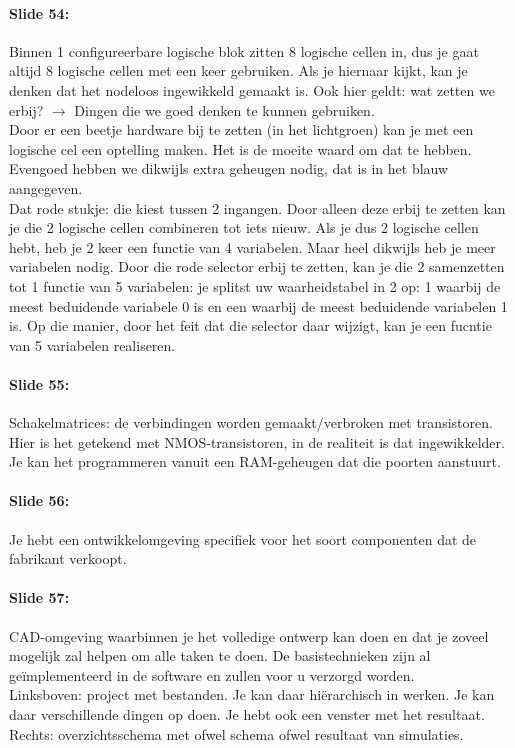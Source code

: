 \documentclass[10pt,a4paper]{book}
\begin{document}
\paragraph{Slide 54:} Binnen 1 configureerbare logische blok zitten 8 logische cellen in, dus je gaat altijd 8 logische cellen met een keer gebruiken. Als je hiernaar kijkt, kan je denken dat het nodeloos ingewikkeld gemaakt is. Ook hier geldt: wat zetten we erbij? $\rightarrow$ Dingen die we goed denken te kunnen gebruiken. \\
Door er een beetje hardware bij te zetten (in het lichtgroen) kan je met een logische cel een optelling maken. Het is de moeite waard om dat te hebben.\\
Evengoed hebben we dikwijls extra geheugen nodig, dat is in het blauw aangegeven.\\
Dat rode stukje: die kiest tussen 2 ingangen. Door alleen deze erbij te zetten kan je die 2 logische cellen combineren tot iets nieuw. Als je dus 2 logische cellen hebt, heb je 2 keer een functie van 4 variabelen. Maar heel dikwijls heb je meer variabelen nodig. Door die rode selector erbij te zetten, kan je die 2 samenzetten tot 1 functie van 5 variabelen: je splitst uw waarheidstabel in 2 op: 1 waarbij de meest beduidende variabele 0 is en een waarbij de meest beduidende variabelen 1 is. Op die manier, door het feit dat die selector daar wijzigt, kan je een fucntie van 5 variabelen realiseren.

\paragraph{Slide 55:} Schakelmatrices: de verbindingen worden gemaakt/verbroken met transistoren.  Hier is het getekend met NMOS-transistoren, in de realiteit is dat ingewikkelder.  Je kan het programmeren vanuit een RAM-geheugen dat die poorten aanstuurt. 

\paragraph{Slide 56:} Je hebt een ontwikkelomgeving specifiek voor het soort componenten dat de fabrikant verkoopt.

\paragraph{Slide 57:} CAD-omgeving waarbinnen je het volledige ontwerp kan doen en dat je zoveel mogelijk zal helpen om alle taken te doen. De basistechnieken zijn al ge\"implementeerd in de software en zullen voor u verzorgd worden.\\
Linksboven: project met bestanden. Je kan daar hi\"erarchisch in werken. Je kan daar verschillende dingen op doen. Je hebt ook een venster met het resultaat. Rechts: overzichtsschema met ofwel schema ofwel resultaat van simulaties.
\end{document}
